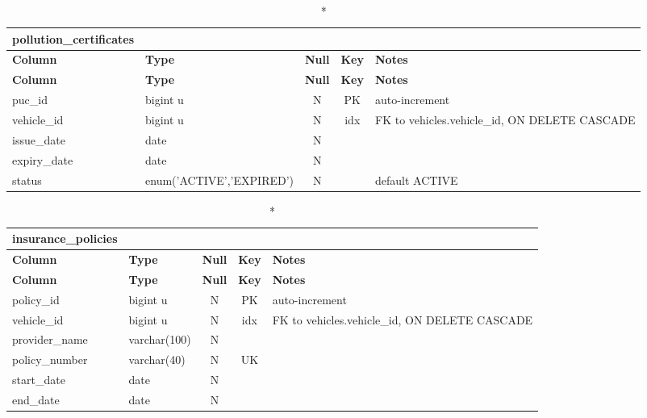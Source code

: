 \vspace{-0.4em}
\begin{longtable}{@{}p{3.4cm}p{2.9cm}c c p{5.6cm}@{}}
\caption*{\textbf{pollution\_\allowbreak{}certificates}}\\
\toprule \textbf{Column} & \textbf{Type} & \textbf{Null} & \textbf{Key} & \textbf{Notes} \\ \midrule \endfirsthead
\toprule \textbf{Column} & \textbf{Type} & \textbf{Null} & \textbf{Key} & \textbf{Notes} \\ \midrule \endhead
\bottomrule \endlastfoot
puc\_\allowbreak{}id & bigint u & N & PK & auto-increment \\
vehicle\_\allowbreak{}id & bigint u & N & idx & FK to vehicles.vehicle\_\allowbreak{}id, ON DELETE CASCADE \\
issue\_\allowbreak{}date & date & N &  &  \\
expiry\_\allowbreak{}date & date & N &  &  \\
status & enum('ACTIVE',\allowbreak{}'EXPIRED') & N &  & default ACTIVE \\
\end{longtable}
\vspace{-0.4em}
\begin{longtable}{@{}p{3.4cm}p{2.9cm}c c p{5.6cm}@{}}
\caption*{\textbf{insurance\_\allowbreak{}policies}}\\
\toprule \textbf{Column} & \textbf{Type} & \textbf{Null} & \textbf{Key} & \textbf{Notes} \\ \midrule \endfirsthead
\toprule \textbf{Column} & \textbf{Type} & \textbf{Null} & \textbf{Key} & \textbf{Notes} \\ \midrule \endhead
\bottomrule \endlastfoot
policy\_\allowbreak{}id & bigint u & N & PK & auto-increment \\
vehicle\_\allowbreak{}id & bigint u & N & idx & FK to vehicles.vehicle\_\allowbreak{}id, ON DELETE CASCADE \\
provider\_\allowbreak{}name & varchar(100) & N &  &  \\
policy\_\allowbreak{}number & varchar(40) & N & UK &  \\
start\_\allowbreak{}date & date & N &  &  \\
end\_\allowbreak{}date & date & N &  &  \\
\end{longtable}
\vspace{-0.4em}
